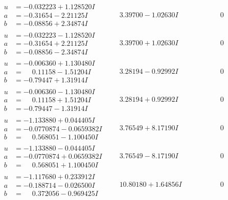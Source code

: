 \documentclass[1p]{elsarticle_modified}
\theoremstyle{definition}
\begin{document}
$$\begin{array}{c|c|c}
\begin{aligned}
u &= -0.032223 + 1.128520 I \\
a &= -0.31654 - 2.21125 I \\
b &= -0.08856 + 2.34874 I\end{aligned}
 & \phantom{-}3.39700 - 1.02630 I & \phantom{-0.000000 } 0 \\ \hline\begin{aligned}
u &= -0.032223 - 1.128520 I \\
a &= -0.31654 + 2.21125 I \\
b &= -0.08856 - 2.34874 I\end{aligned}
 & \phantom{-}3.39700 + 1.02630 I & \phantom{-0.000000 } 0 \\ \hline\begin{aligned}
u &= -0.006360 + 1.130480 I \\
a &= \phantom{-}0.11158 - 1.51204 I \\
b &= -0.79447 + 1.31914 I\end{aligned}
 & \phantom{-}3.28194 - 0.92992 I & \phantom{-0.000000 } 0 \\ \hline\begin{aligned}
u &= -0.006360 - 1.130480 I \\
a &= \phantom{-}0.11158 + 1.51204 I \\
b &= -0.79447 - 1.31914 I\end{aligned}
 & \phantom{-}3.28194 + 0.92992 I & \phantom{-0.000000 } 0 \\ \hline\begin{aligned}
u &= -1.133880 + 0.044405 I \\
a &= -0.0770874 - 0.0659382 I \\
b &= \phantom{-}0.568051 - 1.100450 I\end{aligned}
 & \phantom{-}3.76549 + 8.17190 I & \phantom{-0.000000 } 0 \\ \hline\begin{aligned}
u &= -1.133880 - 0.044405 I \\
a &= -0.0770874 + 0.0659382 I \\
b &= \phantom{-}0.568051 + 1.100450 I\end{aligned}
 & \phantom{-}3.76549 - 8.17190 I & \phantom{-0.000000 } 0 \\ \hline\begin{aligned}
u &= -1.117680 + 0.233912 I \\
a &= -0.188714 - 0.026500 I \\
b &= \phantom{-}0.372056 - 0.969425 I\end{aligned}
 & \phantom{-}10.80180 + 1.64856 I & \phantom{-0.000000 } 0 \\ \hline\begin{aligned}

\end{aligned}
\end{array}$$
\end{document}
